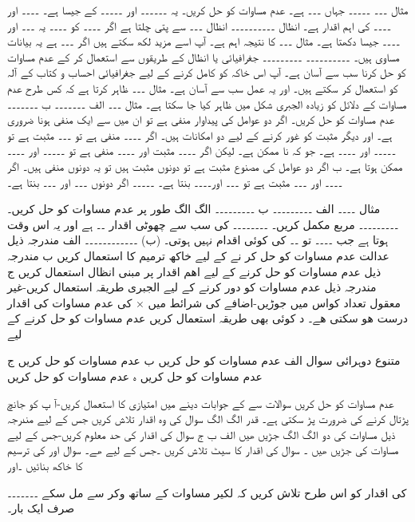 مثال ۔۔۔
۔۔۔۔۔ جہاں ۔۔۔ ہے۔ عدم مساوات کو حل کریں۔ یہ ۔۔۔۔۔۔ اور ۔۔۔۔۔ کے جیسا ہے۔ ۔۔۔۔ اور ۔۔۔۔ کی اہم اقدار ہے۔
انظال
۔۔۔۔۔۔۔۔۔۔
انظال ۔۔۔ سے پتی چلتا ہے اگر ۔۔۔۔ کو ۔۔۔۔ یہ ۔۔۔ اور ۔۔۔۔ جیسا دکھتا ہے۔
مثال ۔۔۔ کا نتیجہ اہم ہے۔ آپ اسے مزید لکھ سکتے ہیں اگر ۔۔۔ ہے یہ بیانات مساوی ہیں۔
۔۔۔۔۔۔۔۔۔۔  ۔۔۔۔۔۔۔۔۔
جغرافیائی یا انظال کے طریقوں سے استعمال کر کے عدم مساوات کو حل کرنا سب سے آسان ہے۔ آپ اس خاکہ کو کامل کرنے کے لیے جغرافیائی احساب و کتاب کے آلہ کو استعمال کر سکتے ہیں۔ اور یہ عمل سب سے آسان ہے۔
مثال ۔۔۔ ظاہر کرتا ہے کہ کس طرح عدم مساوات کے دلائل کو زیادہ الجبری شکل میں ظاہر کیا جا سکتا ہے۔ 
مثال ۔۔۔
الف ۔۔۔۔۔۔۔
ب ۔۔۔۔۔۔۔
عدم مساوات کو حل کریں۔
اگر دو عوامل کی پیداوار منفی ہے تو ان میں سے ایک منفی ہونا ضروری ہے۔ اور دیگر مثبت کو غور کرنے کے لیے دو امکانات ہیں۔
اگر ۔۔۔۔ منفی ہے تو ۔۔۔ مثبت ہے تو ۔۔۔۔۔ اور ۔۔۔۔ ہے۔ جو کہ نا ممکن ہے۔ لیکن اگر ۔۔۔۔ مثبت اور ۔۔۔۔ منفی ہے تو ۔۔۔۔۔ اور ۔۔۔۔ ممکن ہوتا ہے۔
ب اگر دو عوامل کی مصنوع مثبت ہے تو دونوں مثبت ہیں تو یہ دونوں منفی ہیں۔
اگر ۔۔۔۔ اور ۔۔۔ مثبت ہے تو ۔۔۔ اور۔۔۔۔ بنتا ہے۔ ۔۔۔۔۔ اگر دونوں ۔۔۔ اور ۔۔۔ بنتا ہے۔

مثال ۔۔۔۔
الف ۔۔۔۔۔۔۔۔۔
ب ۔۔۔۔۔۔۔۔۔
الگ الگ طور پر عدم مساوات کو حل کریں۔
۔۔۔۔۔۔۔۔۔ مربع مکمل کریں۔
۔۔۔۔۔۔۔۔ کی سب سے چھوٹی اقدار ۔۔ ہے اور یہ اس وقت ہوتا ہے جب ۔۔۔۔  تو ۔۔ کی کوئی اقدام نہیں ہوتی۔
(ب)  ۔۔۔۔۔۔۔۔۔۔۔۔
الف  مندرجہ ذیل عدالت عدم مساوات کو حل  کر نے کے لیے خاکھ ترمیم کا استعمال کریں 
ب مندرجہ ذیل عدم مساوات کو حل کرنے کے لیے اھم اقدار پر مبنی انظال استعمال کریں  
  ج  مندرجہ ذیل عدم مساوات کو دور کرنے کے لیے الجبری طریقہ استعمال کریں-غیر معقول تعداد کواس میں جوڑیں-اضافے کی شرائط میں × کی عدم مساوات کی اقدار درست ھو سکتی ھے۔ 
د  کوئی بھی طریقہ استعمال کریں عدم مساوات کو حل کرنے کے لیے 

متنوع دوہرائی                    
سوال 
الف   عدم مساوات کو حل کریں 
ب         عدم مساوات کو حل کریں       
ج  عدم مساوات کو حل کریں    
ہ  عدم مساوات کو حل کریں 


عدم مساوات کو حل کریں 
سوالات   سے  کے جوابات دینے میں امتیازی   کا استعمال کریں-آ پ کو جانچ پڑتال کرنے کی ضرورت پڑ سکتی ہے۔ قدر  الگ الگ 
سوال    کی وہ اقدار تلاش کریں جس کے لیے مندرجہ ذیل مساوات کی دو الگ الگ جڑیں ھیں 
الف   ب    ج 
سوال     کی اقدار کی حد معلوم کریں-جس کے لیے       مساوات کی جڑیں ھیں ۔
سوال     کی اقدار کا سیٹ تلاش کریں ۔جس کے لیے       ھے۔
سوال        اور      کی ترسیم کا خاکھ بنائیں ۔اور                              

کی اقدار کو اس طرح تلاش کریں کہ لکیر مساوات کے ساتھ وکر سے مل سکے ۔۔۔۔۔۔۔صرف ایک بار۔


